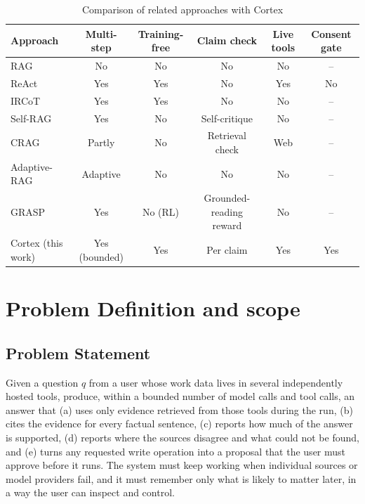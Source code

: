 \documentclass[oneside,a4paper,12pt]{report}
\begin{document}
\begin{table}[!htbp]
\begin{center}
\def\arraystretch{1.3}
\small
\begin{tabularx}{\textwidth}{| X | c | c | c | c | c |}
\hline
Approach & Multi-step & Training-free & Claim check & Live tools & Consent gate \\ \hline
RAG~\cite{lewis2020rag} & No & No & No & No & -- \\ \hline
ReAct~\cite{yao2023react} & Yes & Yes & No & Yes & No \\ \hline
IRCoT~\cite{trivedi2023ircot} & Yes & Yes & No & No & -- \\ \hline
Self-RAG~\cite{asai2024selfrag} & Yes & No & Self-critique & No & -- \\ \hline
CRAG~\cite{yan2024crag} & Partly & No & Retrieval check & Web & -- \\ \hline
Adaptive-RAG~\cite{jeong2024adaptiverag} & Adaptive & No & No & No & -- \\ \hline
GRASP~\cite{grasp2026} & Yes & No (RL) & Grounded-reading reward & No & -- \\ \hline
Cortex (this work) & Yes (bounded) & Yes & Per claim & Yes & Yes \\ \hline
\end{tabularx}
\end{center}
\caption{Comparison of related approaches with Cortex}
\label{tab:litcompare}
\end{table}


\chapter{Problem Definition and scope}
\section{Problem Statement}
Given a question $q$ from a user whose work data lives in several independently hosted tools, produce, within a bounded number of model calls and tool calls, an answer that (a) uses only evidence retrieved from those tools during the run, (b) cites the evidence for every factual sentence, (c) reports how much of the answer is supported, (d) reports where the sources disagree and what could not be found, and (e) turns any requested write operation into a proposal that the user must approve before it runs. The system must keep working when individual sources or model providers fail, and it must remember only what is likely to matter later, in a way the user can inspect and control.
\end{document}

